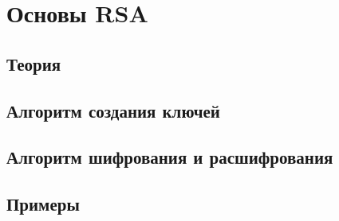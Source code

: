 \section{Основы RSA}

\subsection{Теория}

\subsection{Алгоритм создания ключей}

\subsection{Алгоритм шифрования и расшифрования}

\subsection{Примеры}